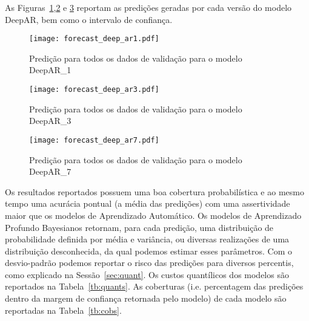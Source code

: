 As Figuras~\ref{fig:fordeepar1},\ref{fig:fordeepar3} e \ref{fig:fordeepar7} reportam as
predições geradas por cada versão do modelo DeepAR, bem como o intervalo de confiança. 

\begin{figure}[H]
  \centering
  \texttt{[image: forecast\_deep\_ar1.pdf]} 
  \caption{Predição para todos os dados de validação para o modelo DeepAR\_1}
  \label{fig:fordeepar1}
\end{figure}

\begin{figure}[H]
  \centering
  \texttt{[image: forecast\_deep\_ar3.pdf]} 
  \caption{Predição para todos os dados de validação para o modelo DeepAR\_3}
  \label{fig:fordeepar3}
\end{figure}

\begin{figure}[H]
  \centering
  \texttt{[image: forecast\_deep\_ar7.pdf]} 
  \caption{Predição para todos os dados de validação para o modelo DeepAR\_7}
  \label{fig:fordeepar7}
\end{figure}


Os resultados reportados possuem uma boa cobertura probabilística e ao mesmo
tempo uma acurácia pontual (a média das predições) com uma assertividade maior
que os modelos de Aprendizado Automático. Os modelos de Aprendizado Profundo Bayesianos retornam, para cada predição, uma distribuição de
probabilidade definida por média e variância, ou diversas realizações de uma
distribuição desconhecida, da qual podemos estimar esses parâmetros. 
Com o desvio-padrão podemos reportar o risco das predições para diversos percentis, como explicado na
Sessão~\ref{sec:quant}. Os custos quantílicos dos modelos são reportados na
Tabela~\ref{tb:quants}. As coberturas (i.e. percentagem das predições dentro da
margem de confiança retornada pelo modelo) de cada modelo são reportadas na Tabela~\ref{tb:cobs}.


